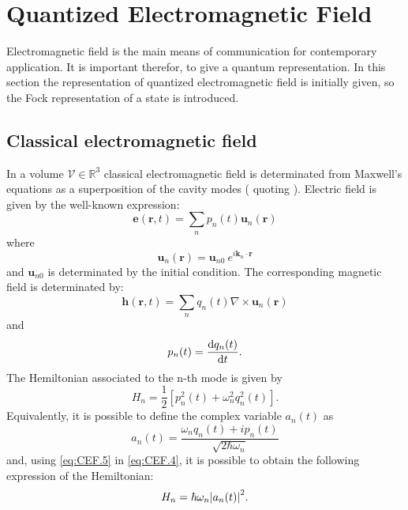 \section{Quantized Electromagnetic Field}
    Electromagnetic field is the main means of communication for contemporary
    application. It is important therefor, to give a quantum representation.
    In this section the representation of quantized electromagnetic field is 
    initially given, so the Fock representation of a state is introduced.
            
    \subsection{Classical electromagnetic field}
        In a volume $\mathcal{V}\in\mathbb{R}^3$ classical electromagnetic field is 
        determinated from Maxwell's equations as a superposition of the cavity modes
        (\cite{tesiGuerrini} quoting \cite{quantumRad_Louissel,quantumOptic_Mandel}).
        Electric field is given by the well-known expression:
        \begin{equation}
            \mathbf{e}(\mathbf{r},t)=\sum_n p_n (t)\mathbf{u}_n (\mathbf{r})
            \label{eq:CEF.1}
        \end{equation}
        where
        \begin{equation*}
            \mathbf{u}_n (\mathbf{r})=\mathbf{u}_{n0}\ e^{i\mathbf{k}_n \cdot \mathbf{r}}
        \end{equation*}
        and $\mathbf{u}_{n0}$ is determinated by the initial condition.
        The corresponding magnetic field is determinated by:
        \begin{equation}
            \mathbf{h}(\mathbf{r},t)=\sum_n q_n (t)\nabla\times\mathbf{u}_n (\mathbf{r})
            \label{eq:CEF.2}
        \end{equation}
        and
        \begin{equation}
            p_n (t)=\derivative{q_n (t)}{t} .
            \label{eq:CEF.3}
        \end{equation}
        The Hemiltonian associated to the n-th mode is given by
        \begin{equation}
            H_n=\frac{1}{2}[p_n^2(t)+\omega_n^2q_n^2(t)].
            \label{eq:CEF.4}
        \end{equation}
        Equivalently, it is possible to define the complex variable $a_n(t)$ as
        \begin{equation}
            a_n(t)=\frac{\omega_nq_n(t)+ip_n(t)}{\sqrt{2\hbar\omega_n}}
            \label{eq:CEF.5}
        \end{equation}
        and, using \ref{eq:CEF.5} in \ref{eq:CEF.4}, it is possible to obtain the following
        expression of the Hemiltonian:
        \begin{equation}
            H_n=\hbar\omega_n\absolutevalue{a_n(t)}^2.
            \label{eq_CEF.6}
        \end{equation}

